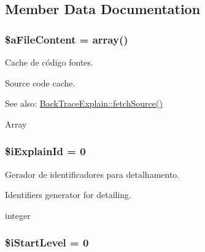 \subsection{Member Data Documentation}
\hypertarget{class_back_trace_explain_a0a32a5b2271bb9f6cd453d6c99512ef}{
\subsubsection[{\$aFileContent}]{\setlength{\rightskip}{0pt plus 5cm}\$aFileContent = array()}}
\label{class_back_trace_explain_a0a32a5b2271bb9f6cd453d6c99512ef}


Cache de código fontes.

Source code cache.

\begin{Desc}
\item[See also:]\hyperlink{class_back_trace_explain_a2d4a5dae4173cbd5465251c211e54eb}{BackTraceExplain::fetchSource()}\end{Desc}
Array \hypertarget{class_back_trace_explain_e8a5d0c1bcba1c6ea8f4b3e216f924a4}{
\subsubsection[{\$iExplainId}]{\setlength{\rightskip}{0pt plus 5cm}\$iExplainId = 0}}
\label{class_back_trace_explain_e8a5d0c1bcba1c6ea8f4b3e216f924a4}


Gerador de identificadores para detalhamento.

Identifiers generator for detailing.

integer \hypertarget{class_back_trace_explain_603094fc8605d016f648673dd6c18f63}{
\subsubsection[{\$iStartLevel}]{\setlength{\rightskip}{0pt plus 5cm}\$iStartLevel = 0}}
\label{class_back_trace_explain_603094fc8605d016f648673dd6c18f63}


